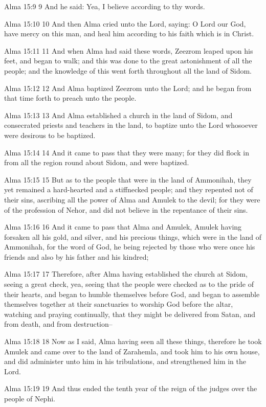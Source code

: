 Alma 15:9
 9 And he said: Yea, I believe according to thy words.

Alma 15:10
 10 And then Alma cried unto the Lord, saying: O Lord our God,
have mercy on this man, and heal him according to his faith which
is in Christ.

Alma 15:11
 11 And when Alma had said these words, Zeezrom leaped upon his
feet, and began to walk; and this was done to the great
astonishment of all the people; and the knowledge of this went
forth throughout all the land of Sidom.

Alma 15:12
 12 And Alma baptized Zeezrom unto the Lord; and he began from
that time forth to preach unto the people.

Alma 15:13
 13 And Alma established a church in the land of Sidom, and
consecrated priests and teachers in the land, to baptize unto the
Lord whosoever were desirous to be baptized.

Alma 15:14
 14 And it came to pass that they were many; for they did flock
in from all the region round about Sidom, and were baptized.

Alma 15:15
 15 But as to the people that were in the land of Ammonihah, they
yet remained a hard-hearted and a stiffnecked people; and they
repented not of their sins, ascribing all the power of Alma and
Amulek to the devil; for they were of the profession of Nehor,
and did not believe in the repentance of their sins.

Alma 15:16
 16 And it came to pass that Alma and Amulek, Amulek having
forsaken all his gold, and silver, and his precious things, which
were in the land of Ammonihah, for the word of God, he being
rejected by those who were once his friends and also by his
father and his kindred;

Alma 15:17
 17 Therefore, after Alma having established the church at Sidom,
seeing a great check, yea, seeing that the people were checked as
to the pride of their hearts, and began to humble themselves
before God, and began to assemble themselves together at their
sanctuaries to worship God before the altar, watching and praying
continually, that they might be delivered from Satan, and from
death, and from destruction--

Alma 15:18
 18 Now as I said, Alma having seen all these things, therefore
he took Amulek and came over to the land of Zarahemla, and took
him to his own house, and did administer unto him in his
tribulations, and strengthened him in the Lord.

Alma 15:19
 19 And thus ended the tenth year of the reign of the judges over
the people of Nephi.

